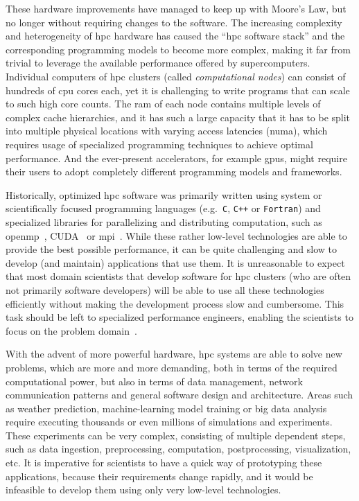 These hardware improvements have managed to keep up with Moore's Law, but no longer without
requiring changes to the software. The increasing complexity and heterogeneity of
\gls{hpc} hardware has caused the ``\gls{hpc} software stack'' and the
corresponding programming models to become more complex, making it far from trivial to leverage the
available performance offered by supercomputers. Individual computers of \gls{hpc}
clusters (called \emph{computational nodes}) can consist of hundreds of \gls{cpu} cores
each, yet it is challenging to write programs that can scale to such high core counts. The
\gls{ram} of each node contains multiple levels of complex cache hierarchies, and it
has such a large capacity that it has to be split into multiple physical locations with varying
access latencies (\gls{numa}), which requires usage of specialized programming
techniques to achieve optimal performance. And the ever-present accelerators, for example
\glspl{gpu}, might require their users to adopt completely different programming models
and frameworks.

Historically, optimized \gls{hpc} software was primarily written using system or
scientifically focused programming languages (e.g.~\texttt{C}, \texttt{C++}
or \texttt{Fortran}) and specialized libraries for parallelizing and distributing
computation, such as \gls{openmp}~\cite{openmp}, CUDA~\cite{cuda} or
\gls{mpi}~\cite{mpistudy}. While these rather low-level technologies are able
to provide the best possible performance, it can be quite challenging and slow to develop (and
maintain) applications that use them. It is unreasonable to expect that most domain scientists that
develop software for \gls{hpc} clusters (who are often not primarily software
developers) will be able to use all these technologies efficiently without making the development
process slow and cumbersome. This task should be left to specialized performance engineers,
enabling the scientists to focus on the problem domain~\cite{dace}.

With the advent of more powerful hardware, \gls{hpc} systems are able to solve new
problems, which are more and more demanding, both in terms of the required computational power, but
also in terms of data management, network communication patterns and general software design and
architecture. Areas such as weather prediction, machine-learning model training or big data
analysis require executing thousands or even millions of simulations and experiments. These
experiments can be very complex, consisting of multiple dependent steps, such as data ingestion,
preprocessing, computation, postprocessing, visualization, etc. It is imperative for scientists to
have a quick way of prototyping these applications, because their requirements change rapidly, and
it would be infeasible to develop them using only very low-level technologies.

